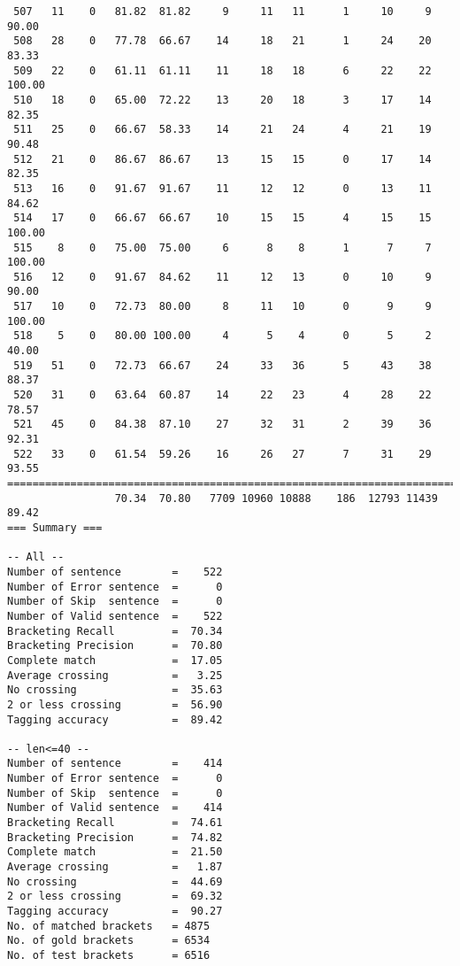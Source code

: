 \begin{verbatim}
 507   11    0   81.82  81.82     9     11   11      1     10     9    90.00
 508   28    0   77.78  66.67    14     18   21      1     24    20    83.33
 509   22    0   61.11  61.11    11     18   18      6     22    22   100.00
 510   18    0   65.00  72.22    13     20   18      3     17    14    82.35
 511   25    0   66.67  58.33    14     21   24      4     21    19    90.48
 512   21    0   86.67  86.67    13     15   15      0     17    14    82.35
 513   16    0   91.67  91.67    11     12   12      0     13    11    84.62
 514   17    0   66.67  66.67    10     15   15      4     15    15   100.00
 515    8    0   75.00  75.00     6      8    8      1      7     7   100.00
 516   12    0   91.67  84.62    11     12   13      0     10     9    90.00
 517   10    0   72.73  80.00     8     11   10      0      9     9   100.00
 518    5    0   80.00 100.00     4      5    4      0      5     2    40.00
 519   51    0   72.73  66.67    24     33   36      5     43    38    88.37
 520   31    0   63.64  60.87    14     22   23      4     28    22    78.57
 521   45    0   84.38  87.10    27     32   31      2     39    36    92.31
 522   33    0   61.54  59.26    16     26   27      7     31    29    93.55
============================================================================
                 70.34  70.80   7709 10960 10888    186  12793 11439    89.42
=== Summary ===

-- All --
Number of sentence        =    522
Number of Error sentence  =      0
Number of Skip  sentence  =      0
Number of Valid sentence  =    522
Bracketing Recall         =  70.34
Bracketing Precision      =  70.80
Complete match            =  17.05
Average crossing          =   3.25
No crossing               =  35.63
2 or less crossing        =  56.90
Tagging accuracy          =  89.42

-- len<=40 --
Number of sentence        =    414
Number of Error sentence  =      0
Number of Skip  sentence  =      0
Number of Valid sentence  =    414
Bracketing Recall         =  74.61
Bracketing Precision      =  74.82
Complete match            =  21.50
Average crossing          =   1.87
No crossing               =  44.69
2 or less crossing        =  69.32
Tagging accuracy          =  90.27
No. of matched brackets   = 4875
No. of gold brackets      = 6534
No. of test brackets      = 6516

\end{verbatim}

\normalsize

